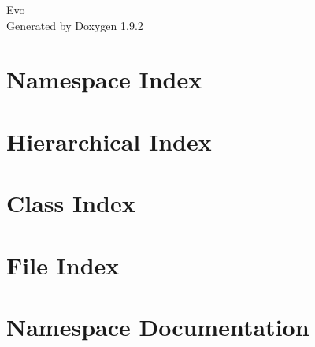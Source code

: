 \documentclass[twoside]{book}
\newcommand{\+}{\discretionary{\mbox{\scriptsize$\hookleftarrow$}}{}{}}
\newcommand{\clearemptydoublepage}{%
    \newpage{\pagestyle{empty}\cleardoublepage}%
  }
\begin{document}
  \raggedbottom
    \hypersetup{pageanchor=false,
                bookmarksnumbered=true,
                pdfencoding=unicode
               }
  \begin{titlepage}
  \vspace*{7cm}
  \begin{center}%
  {\Large Evo}\\
  \vspace*{1cm}
  {\large Generated by Doxygen 1.9.2}\\
  \end{center}
  \end{titlepage}
  \clearemptydoublepage
  \tableofcontents
  \clearemptydoublepage
  \hypersetup{pageanchor=true}
\chapter{Namespace Index}

\chapter{Hierarchical Index}

\chapter{Class Index}

\chapter{File Index}

\chapter{Namespace Documentation}

\end{document}
